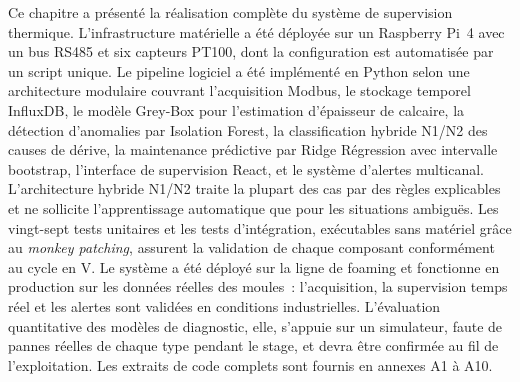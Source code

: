 Ce chapitre a présenté la réalisation complète du système de supervision thermique. L'infrastructure matérielle a été déployée sur un Raspberry Pi~4 avec un bus RS485 et six capteurs PT100, dont la configuration est automatisée par un script unique. Le pipeline logiciel a été implémenté en Python selon une architecture modulaire couvrant l'acquisition Modbus, le stockage temporel InfluxDB, le modèle Grey-Box pour l'estimation d'épaisseur de calcaire, la détection d'anomalies par Isolation Forest, la classification hybride N1/N2 des causes de dérive, la maintenance prédictive par Ridge Régression avec intervalle bootstrap, l'interface de supervision React, et le système d'alertes multicanal. L'architecture hybride N1/N2 traite la plupart des cas par des règles explicables et ne sollicite l'apprentissage automatique que pour les situations ambiguës. Les vingt-sept tests unitaires et les tests d'intégration, exécutables sans matériel grâce au \textit{monkey patching}, assurent la validation de chaque composant conformément au cycle en V. Le système a été déployé sur la ligne de foaming et fonctionne en production sur les données réelles des moules~: l'acquisition, la supervision temps réel et les alertes sont validées en conditions industrielles. L'évaluation quantitative des modèles de diagnostic, elle, s'appuie sur un simulateur, faute de pannes réelles de chaque type pendant le stage, et devra être confirmée au fil de l'exploitation. Les extraits de code complets sont fournis en annexes A1 à A10.